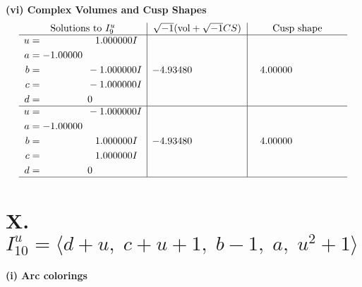 \documentclass[1p]{elsarticle_modified}
\theoremstyle{definition}
\newcommand{\I}{\sqrt{-1}}
\begin{document}
\newpage\flushleft \textbf{(vi) Complex Volumes and Cusp Shapes}
$$\begin{array}{c|c|c}  
\text{Solutions to }I^u_{9}& \I (\text{vol} + \sqrt{-1}CS) & \text{Cusp shape}\\
 \hline 
\begin{aligned}
u &= \phantom{-0.000000 -}1.000000 I \\
a &= -1.00000\phantom{ +0.000000I} \\
b &= \phantom{-0.000000 } -1.000000 I \\
c &= \phantom{-0.000000 } -1.000000 I \\
d &= \phantom{-0.000000 } 0\end{aligned}
 & -4.93480\phantom{ +0.000000I} & \phantom{-}4.00000\phantom{ +0.000000I} \\ \hline\begin{aligned}
u &= \phantom{-0.000000 } -1.000000 I \\
a &= -1.00000\phantom{ +0.000000I} \\
b &= \phantom{-0.000000 -}1.000000 I \\
c &= \phantom{-0.000000 -}1.000000 I \\
d &= \phantom{-0.000000 } 0\end{aligned}
 & -4.93480\phantom{ +0.000000I} & \phantom{-}4.00000\phantom{ +0.000000I}\\
 \hline 
 \end{array}$$\newpage\newpage\renewcommand{\arraystretch}{1}
\centering \section*{X. $I^u_{10}= \langle d+u,\;c+u+1,\;b-1,\;a,\;u^2+1 \rangle$}
\flushleft \textbf{(i) Arc colorings}\\
\end{document}
